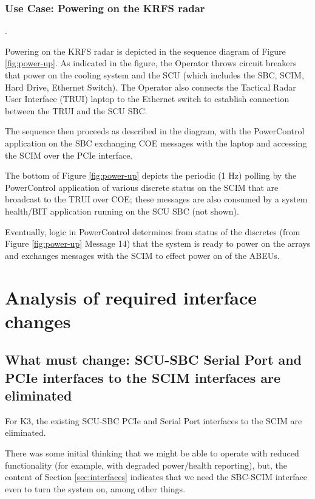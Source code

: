 \documentclass[12pt]{article}
\begin{document}
{\begin{table}[H]
{\begin{tabular}{p{2.1in}p{1.2in}p{1.2in}p{2.0in}}
    \hline
    \end{tabular}%
    }
    \label{tab:coe_msgs}
\end{table}

\subsubsection{Use Case: Powering on the KRFS radar}
\label{sec:power-up}.

Powering on the KRFS radar is depicted in the sequence diagram of Figure \ref{fig:power-up}.  As indicated in the figure, the Operator throws circuit breakers
that power on the cooling system and the SCU (which includes the SBC, SCIM, Hard Drive, Ethernet Switch).  The Operator also connects the Tactical Radar User Interface (TRUI) laptop to the Ethernet switch to establish connection between the TRUI and the SCU SBC.

The sequence then proceeds as described in the diagram, with the PowerControl application on the SBC exchanging COE messages with the laptop and accessing the SCIM over the PCIe interface.

The bottom of Figure \ref{fig:power-up} depicts the periodic (1 Hz) polling
by the PowerControl application of various discrete status on the SCIM that
are broadcast to the TRUI over COE; these messages are also consumed by a
system health/BIT application running on the SCU SBC (not shown).

Eventually, logic in PowerControl determines from status of the discretes (from Figure \ref{fig:power-up} Message 14) that the system is ready to power on the arrays and exchanges messages with the SCIM to effect power on of the ABEUs.


\section{Analysis of required interface changes}


\subsection{What must change: SCU-SBC Serial Port and PCIe interfaces to the SCIM interfaces are eliminated}

For K3, the existing SCU-SBC PCIe and Serial Port interfaces to the SCIM are eliminated.

There was some initial thinking that we might be able to operate with reduced functionality (for example, with degraded power/health reporting), but, the content of Section \ref{sec:interfaces} indicates that we need the SBC-SCIM interface even to turn the system on, among other things.

}
\end{document}
